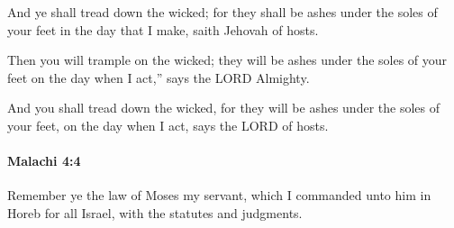 			\begin{versebox}
					\item[BHS] 
					\item[LXX] 
					\item[ASV] And ye shall tread down the wicked; for they shall be ashes under the soles of your feet in the day that I make, saith Jehovah of hosts.
					\item[NIV] Then you will trample on the wicked; they will be ashes under the soles of your feet on the day when I act,” says the LORD Almighty.
					\item[NRSV] And you shall tread down the wicked, for they will be ashes under the soles of your feet, on the day when I act, says the LORD of hosts.
			\end{versebox}

		\paragraph{Malachi 4:4} %
			\label{MALACHI-4-4}

			Remember ye the law of Moses my servant, which I commanded unto him in Horeb for all Israel, with the statutes and judgments.

